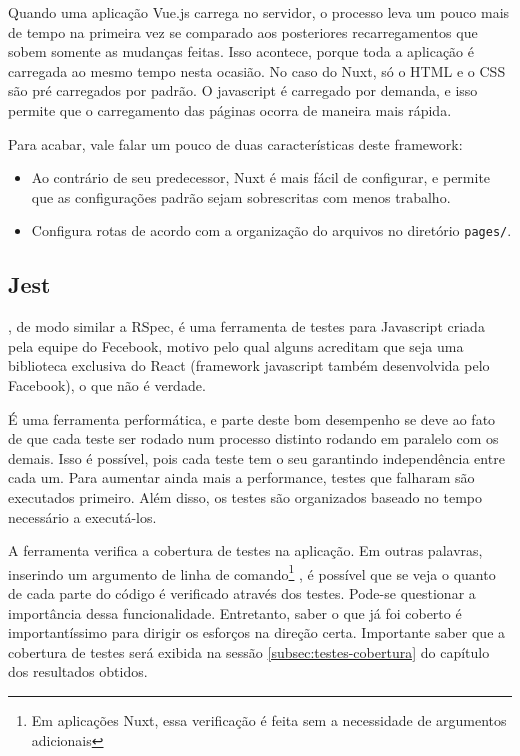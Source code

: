 Quando uma aplicação Vue.js carrega no servidor, o processo leva um pouco mais de tempo na primeira
vez se comparado aos posteriores recarregamentos que sobem somente as mudanças feitas. Isso acontece,
porque toda a aplicação é carregada ao mesmo tempo nesta ocasião. No caso do Nuxt, só o HTML e o CSS
são pré carregados por padrão. O javascript é carregado por demanda, e isso permite que o carregamento
das páginas ocorra de maneira mais rápida.

Para acabar, vale falar um pouco de duas características deste framework:
\begin{itemize}
    \item Ao contrário de seu predecessor, Nuxt é mais fácil de configurar, e permite que as configurações
    padrão sejam sobrescritas com menos trabalho.
    \item Configura rotas de acordo com a organização do arquivos no diretório \texttt{pages/}.
\end{itemize}

\subsection{Jest}\label{subsec:jest}

, de modo similar a RSpec, é uma ferramenta de testes para Javascript criada pela equipe do Fecebook,
motivo pelo qual alguns acreditam que seja uma biblioteca exclusiva do React (framework javascript também
desenvolvida pelo Facebook), o que não é verdade.

É uma ferramenta performática, e parte deste bom desempenho se deve ao fato de que cada teste ser rodado
num processo distinto rodando em paralelo com os demais. Isso é possível, pois cada teste tem o seu
 garantindo independência entre cada um. Para aumentar ainda mais a performance, testes
que falharam são executados primeiro. Além disso, os testes são organizados baseado no tempo necessário a
executá-los.

A ferramenta verifica a cobertura de testes na aplicação. Em outras palavras, inserindo um argumento de linha
de comando\footnote{Em aplicações Nuxt, essa verificação é feita sem a necessidade de argumentos adicionais}
\texttt{}, é possível que se veja o quanto de cada parte do código é verificado através dos
testes. Pode-se questionar a importância dessa funcionalidade. Entretanto, saber o que já foi coberto é
importantíssimo para dirigir os esforços na direção certa. Importante saber que a cobertura de testes será
exibida na sessão \ref{subsec:testes-cobertura} do capítulo dos resultados obtidos.

